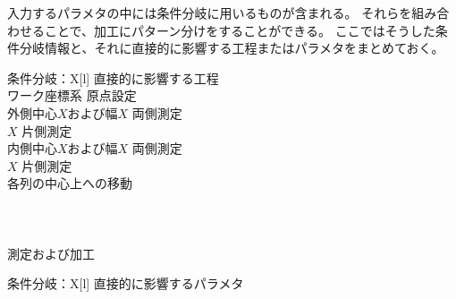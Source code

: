 

入力するパラメタの中には条件分岐に用いるものが含まれる。
それらを組み合わせることで、加工にパターン分けをすることができる。
ここではそうした条件分岐情報と、それに直接的に影響する工程またはパラメタをまとめておく。




\begin{multicollongtblr}{条件分岐：\PMCenterCurvatureExists}{X[l]}
直接的に影響する工程\\
ワーク座標系 原点設定\\
外側中心$X$および幅$X$ 両側測定\\
\KeywayCenter$X$ 片側測定\\
内側中心$X$および幅$X$ 両側測定\\
\OutcutCenter$X$ 片側測定\\
\indexDimpleMeasurement\indexDimpleMilling{} 各列の中心上への移動\\
\KeywayMilling\\
\EndFaceOutChamferMilling\\
\EndFaceInChamferMilling\\
\indexReliefGrooveMeasurement\indexReliefGrooveMilling\nameReliefGroove 測定および加工\\
\end{multicollongtblr}

\begin{multicollongtblr}{条件分岐：\PMBottomALBracketDimensionExists}{X[l]}
直接的に影響するパラメタ\\
\AlocationLength\\
\end{multicollongtblr}



\clearpage

